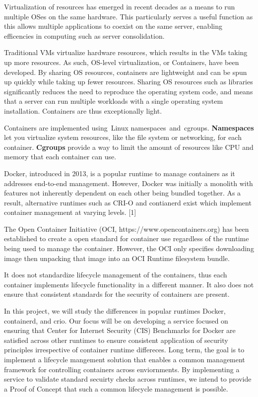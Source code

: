 Virtualization of resources has emerged in recent decades as a means to run multiple OSes on the same hardware. This particularly serves a useful function as this allows multiple applications to coexist on the same server, enabling efficencies in computing such as server consolidation.

Traditional VMs virtualize hardware resources, which results in the VMs taking up more resources. As such, OS-level virtualization, or Containers, have been developed. By sharing OS resources, containers are lightweight and can be spun up quickly while taking up fewer resources.
Sharing OS resources such as libraries significantly reduces the need to reproduce the operating system code, and means that a server can run multiple workloads with a single operating system installation.
Containers are thus exceptionally light.

Containers are implemented using Linux namespaces and cgroups. \textbf{Namespaces} let you virtualize system resources, like the file system or networking, for each container. \textbf{Cgroups} provide a way to limit the amount of resources like CPU and memory that each container can use. 


Docker, introduced in 2013, is a popular runtime to manage containers as it addresses end-to-end management. However, Docker was initially a monolith with features not inherently dependent on each other being bundled together. As a result, alternative runtimes such as CRI-O and contianerd exist which implement container management at varying levels. [1]

The Open Container Initiative (OCI, https://www.opencontainers.org) has been established to create a open standard for container use regardless of the runtime being used to manage the container. However, the OCI only specifies downloading image then unpacking that image into an OCI Runtime filesystem bundle.

It does not standardize lifecycle management of the containers, thus each container implements lifecycle functionality in a different manner. It also does not ensure that consistent standards for the security of containers are present.

In this project, we will study the differences in popular runtimes Docker, containerd, and crio. Our focus will be on developing a service focused on ensuring that Center for Internet Security (CIS) Benchmarks for Docker are satisfied across other runtimes to ensure consistent application of security principles irrespective of container runtime differeces. Long term, the goal is to implement a lifecycle mangement solution that enables a common management framework for controlling containers across enviornments. By implementing a service to validate standard secuirty checks across runtimes, we intend to provide a Proof of Concept that such a common lifecycle management is possible.

